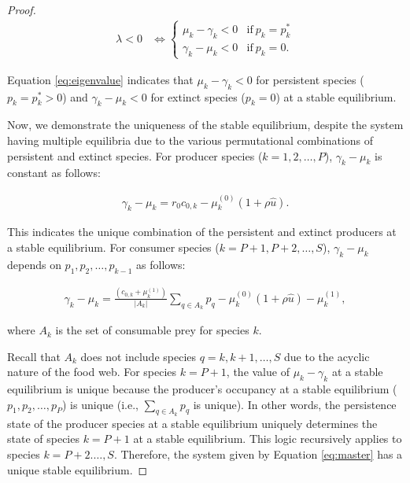 \documentclass[11pt, class=article, crop=false]{standalone}
\theoremstyle{definition}
\begin{document}
\begin{proof}
\begin{align}
    \lambda < 0 &\Leftrightarrow 
    \left\{
    \begin{array}{cc}
         \mu_k - \gamma_k < 0   &\text{if}~ p_k = p_k^*\\
         \gamma_k - \mu_k < 0   &\text{if}~ p_k = 0.
    \end{array}
    \right.
    \label{eq:eigenvalue}
\end{align}

Equation \ref{eq:eigenvalue} indicates that $\mu_k - \gamma_k < 0$ for persistent species ($p_k = p_k^*>0$) and $\gamma_k - \mu_k < 0$ for extinct species ($p_k=0$) at a stable equilibrium.

Now, we demonstrate the uniqueness of the stable equilibrium, despite the system having multiple equilibria due to the various permutational combinations of persistent and extinct species.
For producer species ($k=1,2,\ldots, P$), $\gamma_k-\mu_k$ is constant as follows:

\begin{align}
    \gamma_k-\mu_k = r_0 c_{0, k} - \mu_{k}^{(0)} (1 + \rho \hat{u}).
\end{align}

This indicates the unique combination of the persistent and extinct producers at a stable equilibrium.
For consumer species ($k = P+1, P+2,\ldots, S$), $\gamma_k-\mu_k$ depends on $p_1, p_2, \ldots, p_{k-1}$ as follows:

\begin{align}
    \gamma_k-\mu_k = \frac{\left(c_{0, k}+\mu_{k}^{(1)}\right)}{|A_k|}\sum_{q \in A_k} p_q
- \mu_{k}^{(0)} (1 + \rho \hat{u})-\mu_{k}^{(1)} ,
\end{align}

where $A_k$ is the set of consumable prey for species $k$.

Recall that $A_k$ does not include species $q = k, k+1, \ldots, S$ due to the acyclic nature of the food web.
For species $k = P+1$, the value of $\mu_k-\gamma_k$ at a stable equilibrium is unique because the producer's occupancy at a stable equilibrium ($p_1, p_2, \ldots, p_P$) is unique (i.e., $\sum_{q \in A_k} p_q$ is unique).
In other words, the persistence state of the producer species at a stable equilibrium uniquely determines the state of species $k = P+1$ at a stable equilibrium.
This logic recursively applies to species $k=P+2. \ldots, S$.
Therefore, the system given by Equation \ref{eq:master} has a unique stable equilibrium.
\end{proof}
\end{document}
